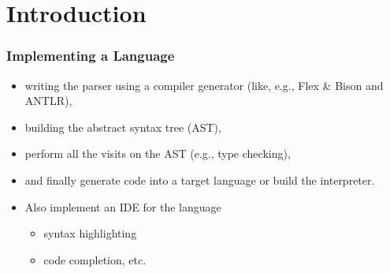 \section{Introduction}

\begin{frame}
  \frametitle{Implementing a Language}

  \begin{itemize}
  \item writing the parser using a compiler generator (like, e.g.,
    Flex \& Bison and ANTLR),
  \item building the abstract syntax tree (AST), 
  \item perform all the visits on the AST (e.g., type checking),
  \item and finally generate code into a target language or build the
    interpreter.
  \end{itemize}


\begin{itemize}
\item Also implement an IDE for the language
  \begin{itemize}
  \item syntax highlighting
  \item code completion, etc.
  \end{itemize}

\end{itemize}
\end{frame}